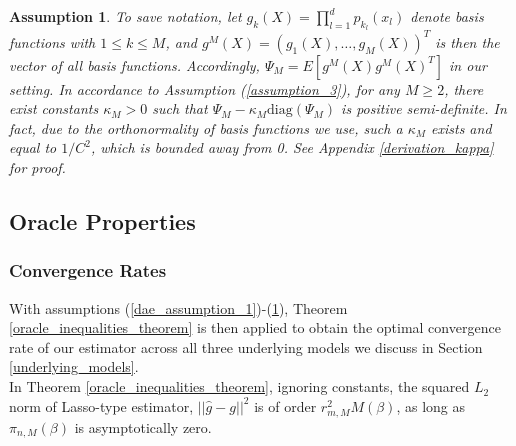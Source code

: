 \documentclass[12pt, a4paper]{article}
\theoremstyle{MAstyle} \newtheorem{assumption}{Assumption}[section]
\theoremstyle{MAstyle} \newtheorem{definition}{Definition}[section]
\theoremstyle{MAstyle} \newtheorem{theorem}{Theorem}[section]
\theoremstyle{MAstyle} \newtheorem{corollary}{Corollary}[section]
\begin{document}
                    \begin{assumption}\label{dae_assumption_3}
                         To save notation, let $g_k(X)=\prod_{l=1}^d p_{k_l}(x_l)$ denote basis functions with $1 \le k \le M$, and $g^M(X)=(g_1(X), \ldots, g_M(X))^T$ is then the vector of all basis functions. Accordingly, $\Psi_M=E[g^M(X)g^M(X)^{T}]$ in our setting. In accordance to Assumption (\ref{assumption_3}), for any $M \ge 2$, there exist constants $\kappa_M>0$ such that $\Psi_M-\kappa_M\mathrm{diag}(\Psi_M)$ is positive semi-definite. In fact, due to the orthonormality of basis functions we use, such a $\kappa_M$ exists and equal to $1/C^2$, which is bounded away from 0. See Appendix \ref{derivation_kappa} for proof.
                    \end{assumption}
                
                \subsection{Oracle Properties}\label{oracle_properties}
                    \subsubsection{Convergence Rates}\label{convergence_rates}
                    With assumptions (\ref{dae_assumption_1})-(\ref{dae_assumption_3}), Theorem \ref{oracle_inequalities_theorem} is then applied to obtain the optimal convergence rate of our estimator across all three underlying models we discuss in Section \ref{underlying_models}. \\

                    In Theorem \ref{oracle_inequalities_theorem}, ignoring constants, the squared $L_2$ norm of Lasso-type estimator, $||\hat{g}-g||^2$ is of order $r_{m,M}^2 M(\beta)$, as long as $\pi_{n,M}(\beta)$ is asymptotically zero. 
\end{document}
